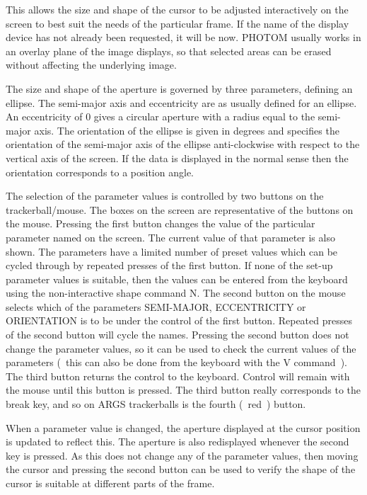 This allows the size and shape of the cursor to be adjusted interactively
on the screen to best suit the needs of the particular frame. If the name
of the display device has not already been requested, it will be now.
PHOTOM usually works in an overlay plane of the image displays, so that
selected areas can be erased without affecting the underlying image.

The size and shape of the aperture is governed by three parameters, defining
an ellipse. The semi-major axis and eccentricity are as usually defined for
an ellipse. An eccentricity of 0 gives a circular aperture with a radius
equal to the semi-major axis. The orientation of the ellipse is given in
degrees and specifies the orientation of the semi-major axis of the ellipse
anti-clockwise with respect to the vertical axis of the screen. If the
data is displayed in the normal sense then the orientation corresponds to
a position angle.

The selection of the parameter values is controlled by two buttons on the
trackerball/mouse. The boxes on the screen are representative of the
buttons on the mouse. Pressing the first button changes the value of the
particular parameter named on the screen. The current value of that
parameter is also shown. The parameters have a limited number of preset
values which can be cycled through by repeated presses of the first
button. If none of the set-up parameter values is suitable, then the
values can be entered from the keyboard using the non-interactive shape
command N. The second button on the mouse selects which of the parameters
SEMI-MAJOR, ECCENTRICITY or ORIENTATION is to be under the control of the
first button. Repeated presses of the second button will cycle the names.
Pressing the second button does not change the parameter values, so it
can be used to check the current values of the parameters (~this can also
be done from the keyboard with the V command~). The third button returns
the control to the keyboard. Control will remain with the mouse until this
button is pressed. The third button really corresponds to the
break key, and so on ARGS trackerballs is the fourth (~red~) button.

When a parameter value is changed, the aperture displayed at the cursor
position is updated to reflect this. The aperture is also redisplayed
whenever the second key is pressed. As this does not change any of the
parameter values, then moving the cursor and pressing the second button
can be used to verify the shape of the cursor is suitable at different
parts of the frame.

